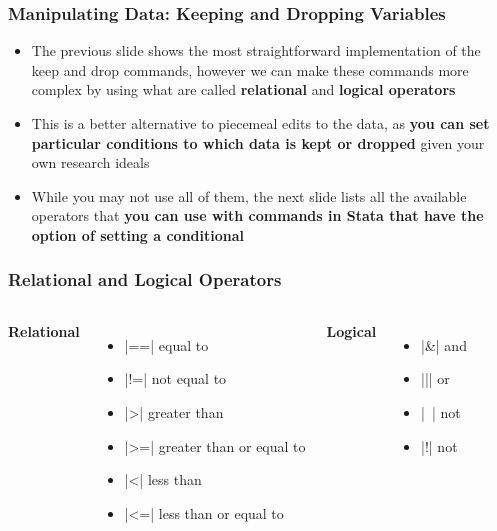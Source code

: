 \documentclass[10pt, compress]{beamer}
\begin{document}
\begin{frame}[fragile]
\frametitle{Manipulating Data: Keeping and Dropping Variables}
\begin{itemize}
\item The previous slide shows the most straightforward implementation of the \alert{keep and drop} commands, however we can make these commands more complex by using what are called \textbf{relational} and \textbf{logical operators}
\item This is a better alternative to piecemeal edits to the data, as \textbf{you can set particular conditions to which data is kept or dropped} given your own research ideals
\item While you may not use all of them, the next slide lists all the available operators that \textbf{you can use with commands in Stata that have the option of setting a conditional}
\end{itemize}
\end{frame}

\begin{frame}[fragile]
\frametitle{Relational and Logical Operators}
  \begin{columns}[onlytextwidth]
      \textbf{Relational}
      \begin{itemize}
\item {}|==| equal to
\item {}|!=| not equal to
\item {}|>| greater than
\item {}|>=| greater than or equal to
\item {}|<| less than
\item {}|<=| less than or equal to
      \end{itemize}

     \textbf{Logical}
      \begin{itemize}
     \item  {}|&| and
	\item {}||| or
	\item {}|~| not
	\item {}|!| not
      \end{itemize}
  \end{columns}
\end{frame}
\end{document}
